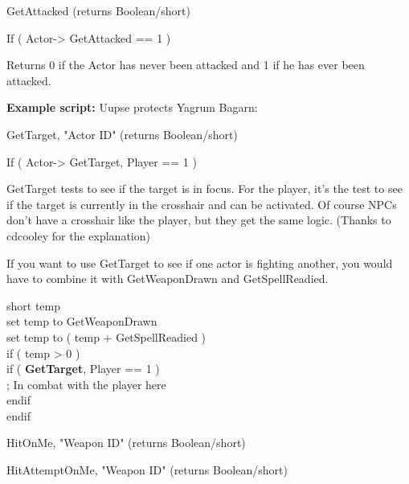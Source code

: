 GetAttacked (returns Boolean/short)

If ( Actor-> GetAttacked == 1 )

Returns 0 if the Actor has never been attacked and 1 if he has ever been
attacked.

\textbf{Example script:} Uupse protects Yagrum Bagarn:



GetTarget, "Actor ID" (returns Boolean/short)

If ( Actor-> GetTarget, Player == 1 )

GetTarget tests to see if the target is in focus. For the player, it's
the test to see if the target is currently in the crosshair and can be
activated. Of course NPCs don't have a crosshair like the player, but
they get the same logic. (Thanks to cdcooley for the explanation)

If you want to use GetTarget to see if one actor is fighting another,
you would have to combine it with GetWeaponDrawn and GetSpellReadied.

short temp\\
set temp to GetWeaponDrawn\\
set temp to ( temp + GetSpellReadied )\\
if ( temp > 0 )\\
\hspace*{0.333em}\hspace*{0.333em}\hspace*{0.333em}\hspace*{0.333em}if (
\textbf{GetTarget}, Player == 1 )\\
\hspace*{0.333em}\hspace*{0.333em}\hspace*{0.333em}\hspace*{0.333em}\hspace*{0.333em}\hspace*{0.333em}
; In combat with the player here\\
\hspace*{0.333em}\hspace*{0.333em}\hspace*{0.333em}\hspace*{0.333em}endif\\
endif

HitOnMe, "Weapon ID" (returns Boolean/short)

HitAttemptOnMe, "Weapon ID" (returns Boolean/short)

